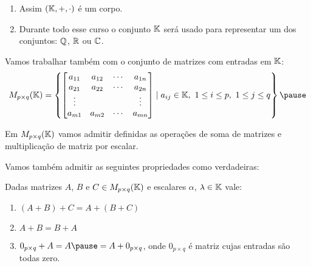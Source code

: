 \documentclass{beamer}
\begin{document}
    \begin{frame}
        \begin{enumerate}[label={\roman*})]
            \item Assim $(\mathbb{K}, +, \cdot)$ é um corpo.\pause

            \vspace{.3cm}

            \item Durante todo esse curso o conjunto $\mathbb{K}$ será usado para representar um dos conjuntos: $\mathbb{Q}$, $\mathbb{R}$ ou $\mathbb{C}$.\pause
        \end{enumerate}
    \end{frame}

    \begin{frame}
        Vamos trabalhar também com o conjunto de matrizes com entradas em $\mathbb{K}$:\pause
        \[
            M_{p \times q}(\cp{K}) =
            \left\{
                \begin{bmatrix}
                    a_{11} & a_{12} & \cdots & a_{1n}\\
		    a_{21} & a_{22} & \cdots & a_{2n}\\
		    \vdots & & & \vdots\\
		    a_{m1} & a_{m2} & \cdots & a_{mn}
                \end{bmatrix}
                \mid a_{ij} \in \cp{K},\ 1 \le i \le p,\ 1 \le j \le q
	    \right\}\pause
        \]
    \end{frame}

    \begin{frame}
        Em $M_{p\times q}(\mathbb{K})$ vamos admitir definidas as operações de soma de matrizes \pause e multiplicação de matriz por escalar.\pause

        Vamos também admitir as seguintes propriedades como verdadeiras:\pause
        \begin{proposicao}
            Dadas matrizes $A$, $B$ e $C \in M_{p\times q}(\mathbb{K})$ \pause e escalares $\alpha$, $\lambda \in \mathbb{K}$ vale:\pause
            \begin{enumerate}[label={\roman*})]
                \item $(A + B) + C = A + (B + C)$\pause
                \item $A + B = B + A$\pause
                \item $0_{p \times q} + A = A \pause = A + 0_{p \times q}$, \pause onde $0_{p \times q}$ é matriz cujas entradas são todas zero.\pause
                \seti
            \end{enumerate}
        \end{proposicao}
    \end{frame}
\end{document}
